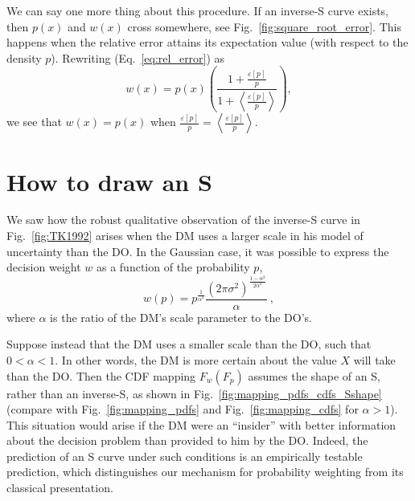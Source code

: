 \documentclass[a4paper, 12pt]{article}
\newcommand{\ave}[1]{\left\langle#1 \right\rangle}
\newcommand{\eref}[1]{(Eq.~\ref{eq:#1})}
\newcommand{\fref}[1]{Fig.~\ref{fig:#1}}
\newcommand{\seclabel}[1]{\label{sec:#1}}
\newcommand{\be}{\begin{equation}}
\newcommand{\ee}{\end{equation}}
\newcommand{\err}[1]{\varepsilon\left[#1\right]}
\begin{document}
We can say one more thing about this procedure. If an inverse-S curve exists, then $p(x)$ and $w(x)$ cross somewhere, see \fref{square_root_error}. This happens when the relative error attains its expectation value (with respect to the density $p$). Rewriting \eref{rel_error} as
\be
w(x)=p(x) \left(\frac{1+\frac{\err{p}}{p}}{1+\ave{\frac{\err{p}}{p}}}\right),
\ee
we see that $w(x)=p(x)$ when $\frac{\err{p}}{p}=\ave{\frac{\err{p}}{p}}.$

\newpage
\section{How to draw an S}
\seclabel{Scurve}

We saw how the robust qualitative observation of the inverse-S curve in \fref{TK1992} arises when the DM uses a larger scale in his model of uncertainty than the DO. In the Gaussian case, it was possible to express the decision weight $w$ as a function of the probability $p$,
\be
w(p)= p^{\frac{1}{\alpha^2}} \frac{\left(2\pi\sigma^2\right)^{\frac{1-\alpha^2}{2\alpha^2}}}{\alpha} ~,
\ee
where $\alpha$ is the ratio of the DM's scale parameter to the DO's.

Suppose instead that the DM uses a smaller scale than the DO, such that $0<\alpha<1$. In other words, the DM is more certain about the value $X$ will take than the DO. Then the CDF mapping $F_w(F_p)$ assumes the shape of an S, rather than an inverse-S, as shown in \fref{mapping_pdfs_cdfs_Sshape} (compare with \fref{mapping_pdfs} and \fref{mapping_cdfs} for $\alpha>1$). This situation would arise if the DM were an ``insider'' with better information about the decision problem than provided to him by the DO. Indeed, the prediction of an S curve under such conditions is an empirically testable prediction, which distinguishes our mechanism for probability weighting from its classical presentation.
\end{document}
